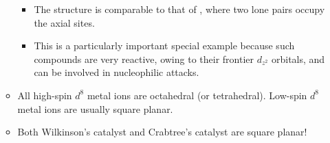 \documentclass[../notes.tex]{subfiles}
\begin{document}
\begin{itemize}
\begin{itemize}
\begin{itemize}
            \item The structure is comparable to that of \ce{[IF4]-}, where two lone pairs occupy the axial sites.
            \item This is a particularly important special example because such compounds are very reactive, owing to their frontier $d_{z^2}$ orbitals, and can be involved in nucleophilic attacks.
        \end{itemize}
        \item All high-spin $d^8$ metal ions are octahedral (or tetrahedral). Low-spin $d^8$ metal ions are usually square planar.
        \item Both Wilkinson's catalyst and Crabtree's catalyst are square planar!
    \end{itemize}
\end{itemize}
\end{document}
